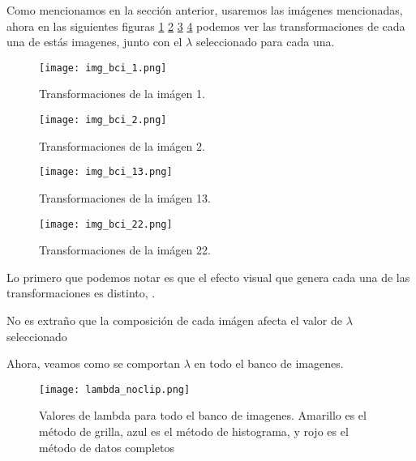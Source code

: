     Como mencionamos en la secci\'on anterior, usaremos las im\'agenes mencionadas, ahora en las siguientes figuras \ref{fig:img_bci_1} \ref{fig:img_bci_2} \ref{fig:img_bci_13} \ref{fig:img_bci_22} podemos ver las transformaciones de cada una de est\'as imagenes, junto con el $\lambda$ seleccionado para cada una.

    \begin{figure}[H]
        \centering
        \texttt{[image: img\_bci\_1.png]}
        \caption{Transformaciones de la im\'agen 1.}
        \label{fig:img_bci_1}
    \end{figure}

    \begin{figure}[H]
        \centering
        \texttt{[image: img\_bci\_2.png]}
        \caption{Transformaciones de la im\'agen 2.}
        \label{fig:img_bci_2}
    \end{figure}

    \begin{figure}[H]
        \centering
        \texttt{[image: img\_bci\_13.png]}
        \caption{Transformaciones de la im\'agen 13.}
        \label{fig:img_bci_13}
    \end{figure}

    \begin{figure}[H]
        \centering
        \texttt{[image: img\_bci\_22.png]}
        \caption{Transformaciones de la im\'agen 22.}
        \label{fig:img_bci_22}
    \end{figure}


    Lo primero que podemos notar es que el efecto visual que genera cada una de las transformaciones es distinto, . 
    
    No es extra\~no que la composici\'on de cada im\'agen afecta el valor de $\lambda$ seleccionado 


    Ahora, veamos como se comportan $\lambda$ en todo el banco de imagenes.

    \begin{figure}[H]
        \texttt{[image: lambda\_noclip.png]}
        \caption{Valores de lambda para todo el banco de imagenes. Amarillo es el m\'etodo de grilla, azul es el m\'etodo de histograma, y rojo es el m\'etodo de datos completos}
        \label{fig:lambda_noclip}
    \end{figure}

